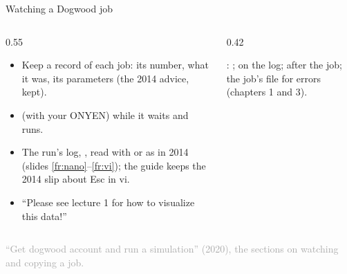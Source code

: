 \documentclass[aspectratio=169,11pt]{beamer}
\newcommand{\sourcecredit}[1]{\vfill\begin{flushright}\tiny\textcolor{DarkGray}{#1}\end{flushright}}
\begin{document}
\begin{frame}{Watching a Dogwood job}
\label{fr:dwwatch}
\begin{columns}[T,onlytextwidth]
\begin{column}{0.55\textwidth}
\small
\begin{itemize}\setlength{\itemsep}{3pt}
  \item Keep a record of each job: its number, what it was, its parameters (the 2014 advice, kept).
  \item {} (with your ONYEN) while it waits and runs.
  \item The run's log, , read with  or  as in 2014 (slides \ref{fr:nano}--\ref{fr:vi}); the guide keeps the 2014 slip about Esc in vi.
  \item ``Please see lecture 1 for how to visualize this data!''
\end{itemize}
\end{column}
\begin{column}{0.42\textwidth}
\begin{punchbox}
\small {}: ;  on the log;  after the job; the job's  file for errors (chapters 1 and 3).
\end{punchbox}
\end{column}
\end{columns}
\sourcecredit{``Get dogwood account and run a simulation'' (2020), the sections on watching and copying a job.}
\end{frame}
\end{document}
